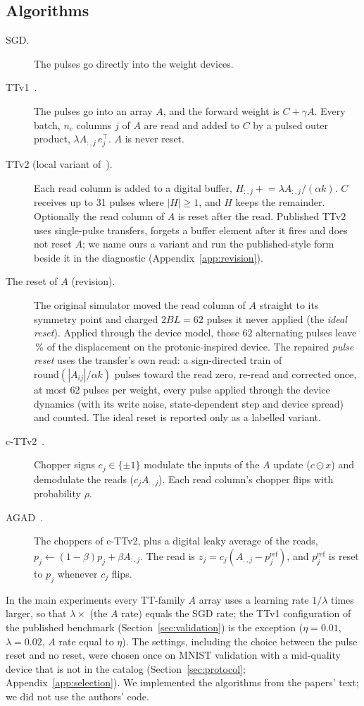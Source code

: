 \subsection{Algorithms}\label{sec:algos}
\begin{description}
\item[SGD.] The pulses go directly into the weight devices.
\item[TTv1~\cite{gokmen2020}.] The pulses go into an array $A$, and the forward weight is $C+\gamma A$. Every batch, $n_c$ columns
      $j$ of $A$ are read and added to $C$ by a pulsed outer product, $\lambda A_{:,j}\,e_j^{\top}$. $A$ is never reset.
\item[TTv2 (local variant of~\cite{gokmen2021}).] Each read column is added to a digital buffer,
      $H_{:,j}\mathrel{+}=\lambda A_{:,j}/(\alpha k)$. $C$ receives up to 31 pulses where $|H|\ge1$, and $H$ keeps the remainder.
      Optionally the read column of $A$ is reset after the read. Published TTv2 uses single-pulse transfers, forgets a buffer
      element after it fires and does not reset $A$; we name ours a variant and run the published-style form beside it in the
      diagnostic (Appendix~\ref{app:revision}).
\item[The reset of $A$ (revision).] The original simulator moved the read column of $A$ straight to its symmetry point and
      charged $2BL=62$ pulses it never applied (the \emph{ideal reset}). Applied through the device model, those 62 alternating
      pulses leave \RVresetResidPct\,\% of the displacement on the protonic-inspired device. The repaired \emph{pulse reset} uses the
      transfer's own read: a sign-directed train of $\mathrm{round}(|A_{ij}|/\alpha k)$ pulses toward the read zero, re-read
      and corrected once, at most 62 pulses per weight, every pulse applied through the device dynamics (with its write noise,
      state-dependent step and device spread) and counted. The ideal reset is reported only as a labelled variant.
\item[c-TTv2~\cite{rasch2024}.] Chopper signs $c_j\in\{\pm1\}$ modulate the inputs of the $A$ update ($c\odot x$) and demodulate
      the reads ($c_jA_{:,j}$). Each read column's chopper flips with probability $\rho$.
\item[AGAD~\cite{rasch2024}.] The choppers of c-TTv2, plus a digital leaky average of the reads,
      $p_j\leftarrow(1-\beta)p_j+\beta A_{:,j}$. The read is $z_j=c_j(A_{:,j}-p^{\mathrm{ref}}_j)$, and $p^{\mathrm{ref}}_j$ is
      reset to $p_j$ whenever $c_j$ flips.
\end{description}
In the main experiments every TT-family $A$ array uses a learning rate $1/\lambda$ times larger, so that $\lambda\times$ (the $A$
rate) equals the SGD rate; the TTv1 configuration of the published benchmark (Section~\ref{sec:validation}) is the exception
($\eta=0.01$, $\lambda=0.02$, $A$ rate equal to $\eta$). The settings, including the choice between the pulse reset and no
reset, were chosen once on MNIST validation with a mid-quality device that is not in the catalog (Section~\ref{sec:protocol};
Appendix~\ref{app:selection}). We implemented the algorithms from the papers' text; we did not use the authors' code.

